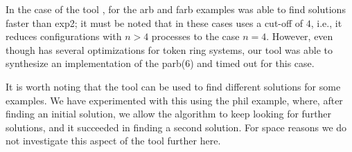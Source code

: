   In the case of the tool {\Party}, for the \textsf{arb} and \textsf{farb} examples {\Party} was able to find solutions faster than \textsf{exp2}; it must be noted that in these cases {\Party} uses a cut-off of $4$,  i.e., it reduces configurations with $n>4$ processes to the case $n=4$.  However,  even though {\Party} has several optimizations for token ring systems, our tool was able to synthesize an implementation of the \textsf{parb(6)} and {\Party} timed out for this case. 
  
It is worth noting that the tool can be used to find different solutions for some examples.  We have experimented with this using the \textsf{phil} example, where, after finding an initial solution, we allow the algorithm to keep looking for further solutions, and it succeeded in finding a second solution.  For space reasons we do not investigate this aspect of the tool further here.

